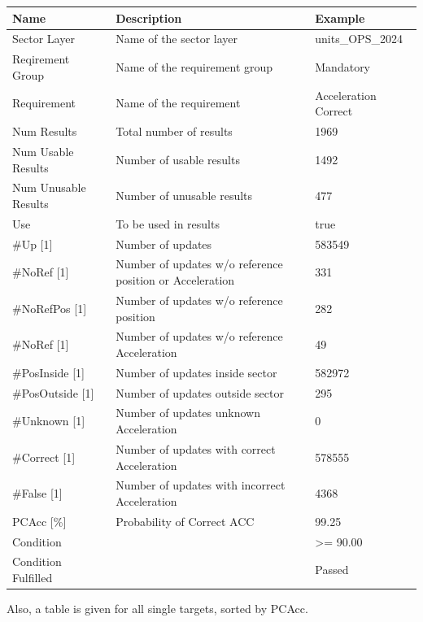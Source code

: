 \begin{center}
 \begin{table}[H]
  \begin{tabularx}{\textwidth}{ | l | X |  l | }
    \hline
    \textbf{Name} & \textbf{Description} & \textbf{Example} \\ \hline
    Sector Layer & Name of the sector layer & units\_OPS\_2024 \\ \hline
    Reqirement Group & Name of the requirement group & Mandatory \\ \hline
    Requirement & Name of the requirement & Acceleration Correct \\ \hline
    Num Results & Total number of results & 1969 \\ \hline
    Num Usable Results & Number of usable results & 1492 \\ \hline
    Num Unusable Results & Number of unusable results & 477 \\ \hline
    Use & To be used in results & true \\ \hline
    \#Up [1] & Number of updates & 583549 \\ \hline
    \#NoRef [1] & Number of updates w/o reference position or Acceleration & 331 \\ \hline
    \#NoRefPos [1] & Number of updates w/o reference position & 282 \\ \hline
    \#NoRef [1] & Number of updates w/o reference Acceleration & 49 \\ \hline
    \#PosInside [1] & Number of updates inside sector & 582972 \\ \hline
    \#PosOutside [1] & Number of updates outside sector & 295 \\ \hline
    \#Unknown [1] & Number of updates unknown Acceleration & 0 \\ \hline
    \#Correct [1] & Number of updates with correct Acceleration & 578555 \\ \hline
    \#False [1] & Number of updates with incorrect Acceleration & 4368 \\ \hline
    PCAcc [\%] & Probability of Correct ACC & 99.25 \\ \hline
    Condition &  & >= 90.00 \\ \hline
    Condition Fulfilled &  & Passed \\ \hline
    \end{tabularx}
\end{table}
\end{center}

Also, a table is given for all single targets, sorted by PCAcc.

